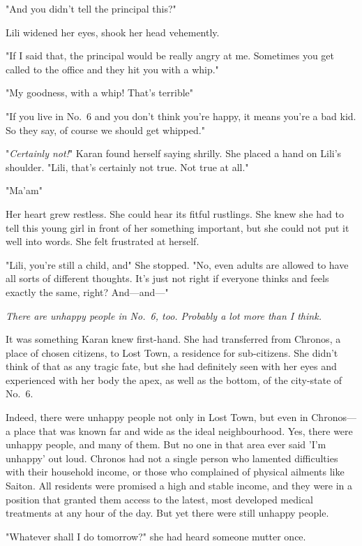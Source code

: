 "And you didn't tell the principal this?"

Lili widened her eyes, shook her head vehemently.

"If I said that, the principal would be really angry at me. Sometimes
you get called to the office and they hit you with a whip."

"My goodness, with a whip! That's terrible\el "

"If you live in No.~6 and you don't think you're happy, it means you're
a bad kid. So they say, of course we should get whipped."

"\emph{Certainly not!}" Karan found herself saying shrilly. She placed a hand
on Lili's shoulder. "Lili, that's certainly not true. Not true at all."

"Ma'am\el "

Her heart grew restless. She could hear its fitful rustlings. She knew
she had to tell this young girl in front of her something important, but
she could not put it well into words. She felt frustrated at herself.

"Lili, you're still a child, and\el " She stopped. "No, even adults are
allowed to have all sorts of different thoughts. It's just not right if
everyone thinks and feels exactly the same, right? And---and---"

\emph{There are unhappy people in No.~6, too. Probably a lot more than I
think.}

It was something Karan knew first-hand. She had transferred from
Chronos, a place of chosen citizens, to Lost Town, a residence for
sub-citizens. She didn't think of that as any tragic fate, but she had
definitely seen with her eyes and experienced with her body the apex, as
well as the bottom, of the city-state of No.~6.

Indeed, there were unhappy people not only in Lost Town, but even in
Chronos---a place that was known far and wide as the ideal neighbourhood.
Yes, there were unhappy people, and many of them. But no one in that
area ever said 'I'm unhappy' out loud. Chronos had not a single person
who lamented difficulties with their household income, or those who
complained of physical ailments like Saiton. All residents were promised
a high and stable income, and they were in a position that granted them
access to the latest, most developed medical treatments at any hour of
the day. But yet there were still unhappy people.

"Whatever shall I do tomorrow?" she had heard someone mutter once.

